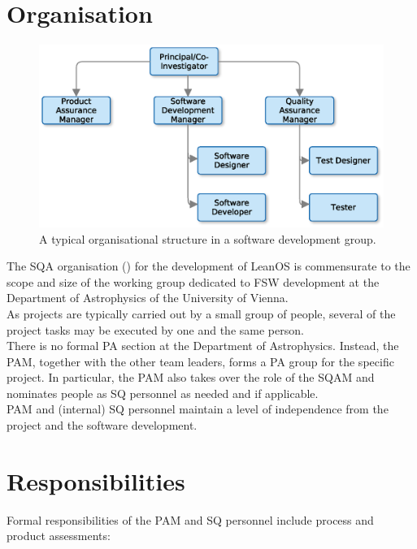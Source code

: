 \section{Organisation}

\begin{figure}[htb]
\begin{center}
	\includegraphics[width=0.7\columnwidth]{images/software_dev_structure}
	\caption{A typical organisational structure in a software development
		 group.}
	\label{fig:sw_dev_org}
\end{center}
\end{figure}

\noindent
The \gls{SQA} organisation () for the development of LeanOS
is commensurate to the scope and size of the working group dedicated to
\gls{FSW} development at the Department of Astrophysics of the University of
Vienna.\\

\noindent
As projects are typically carried out by a small group of people, several of
the project tasks may be executed by one and the same person.\\

\noindent
There is no formal \gls{PA} section at the Department of Astrophysics.
Instead, the \gls{PAM}, together with the other team leaders, forms a \gls{PA}
group for the specific project. In particular, the \gls{PAM} also takes over the
role of the \gls{SQAM} and nominates people as \gls{SQ} personnel as needed
and if applicable.\\

\noindent
\gls{PAM} and (internal) \gls{SQ} personnel maintain a level of independence
from the project and the software development.



\section{Responsibilities}

Formal responsibilities of the \gls{PAM} and \gls{SQ} personnel include process
and product assessments:

